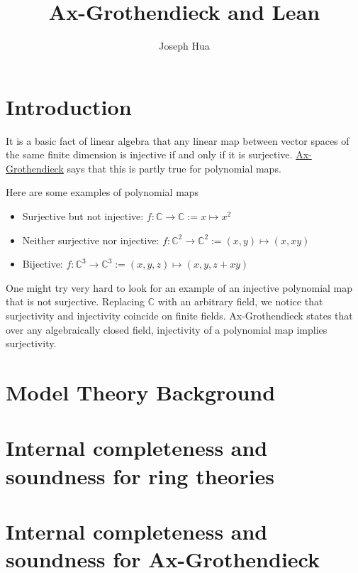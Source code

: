 \documentclass{article}
\newcommand{\C}{\mathbb{C}}
\newcommand{\<}{\langle}
\renewcommand{\>}{\rangle}
\newcommand{\linkto}[2]{\hyperlink{#1}{#2}}
\theoremstyle{definitionstyle}
\theoremstyle{exercisestyle}
\theoremstyle{remarkstyle}
\begin{document}
\title{Ax-Grothendieck and Lean}
\author{Joseph Hua}
\maketitle

\tableofcontents

\section{Introduction}

It is a basic fact of linear algebra that any linear map
between vector spaces of the same finite dimension is
injective if and only if it is surjective.
\linkto{ax_groth_thm}{Ax-Grothendieck} says that this is
partly true for polynomial maps.

Here are some examples of polynomial maps
\begin{itemize}
  \item Surjective but not injective: $f : \C \to \C := x \mapsto x^{2}$
  \item Neither surjective nor injective:
      $f : \C^{2} \to \C^{2} := (x,y) \mapsto (x,xy)$
  \item Bijective:
      $f : \C^{3} \to \C^{3} := (x,y,z) \mapsto ( x , y , z + xy )$
\end{itemize}

One might try very hard to look for an example of an injective polynomial map
that is not surjective.
Replacing $\C$ with an arbitrary field, we notice that
surjectivity and injectivity coincide on finite fields.
Ax-Grothendieck states that over any algebraically closed field,
injectivity of a polynomial map implies surjectivity.

\section{Model Theory Background}



\section{Internal completeness and soundness
  for ring theories}



\section{Internal completeness and soundness
  for Ax-Grothendieck}
\end{document}
